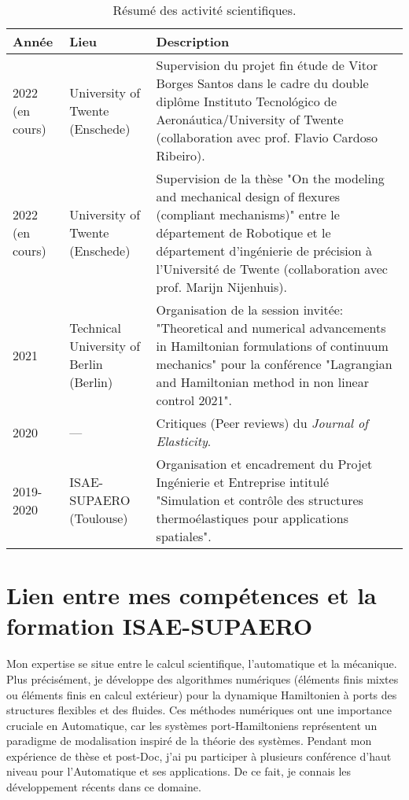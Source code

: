 \documentclass[12pt, french]{article}
\begin{document}
\begin{table}[h]
	\centering
	\begin{tabular}{p{}p{}p{}}
		\hline
		Année & Lieu & Description  \\
		\hline
		2022 (en cours) & University of Twente (Enschede) & Supervision du projet fin étude de Vitor Borges Santos dans le cadre du double diplôme Instituto Tecnológico de Aeronáutica/University of Twente (collaboration avec prof. Flavio Cardoso Ribeiro). \\
		2022 (en cours) & University of Twente (Enschede) & Supervision de la thèse "On the modeling and mechanical design of flexures (compliant mechanisms)" entre le département de Robotique et le département d'ingénierie de précision à l'Université de Twente (collaboration avec prof. Marijn Nijenhuis). \\
		\hline
		2021  & Technical University of Berlin (Berlin) & Organisation de la session invitée: "Theoretical and numerical advancements in Hamiltonian formulations of continuum mechanics" pour la conférence "Lagrangian and Hamiltonian method in non linear control 2021". \\
		\hline
		2020 & --- & Critiques (Peer reviews) du \textit{Journal of Elasticity}. \\
		\hline
		2019-2020 & ISAE-SUPAERO (Toulouse) & Organisation et encadrement du Projet Ingénierie et Entreprise intitulé "Simulation et contrôle des structures thermoélastiques pour
		applications spatiales". \\
		\hline
	\end{tabular}
	\caption{Résumé des activité scientifiques.}
	\label{tab:activites}
\end{table}

\section{Lien entre mes compétences et la formation ISAE-SUPAERO}
	
Mon expertise se situe entre le calcul scientifique, l'automatique et la mécanique. Plus précisément, je développe des algorithmes numériques (éléments finis mixtes ou éléments finis en calcul extérieur) pour la dynamique Hamiltonien à ports des structures flexibles et des fluides. Ces méthodes numériques ont une importance cruciale en Automatique, car les systèmes port-Hamiltoniens représentent un paradigme de modalisation inspiré de la théorie des systèmes. Pendant mon expérience de thèse et post-Doc, j'ai pu participer à plusieurs conférence d'haut niveau pour l'Automatique et ses applications. De ce fait, je connais les développement récents dans ce domaine. \\
\end{document}
